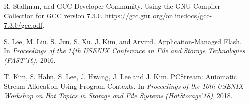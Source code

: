 \begin{thebibliography}{00}
R. Stallman, and GCC Developer Community.
Using the GNU Compiler Collection for GCC version 7.3.0.
\url{https://gcc.gnu.org/onlinedocs/gcc-7.3.0/gcc.pdf}.


S. Lee, M. Liu, S. Jun, S. Xu, J. Kim, and Arvind.
Application-Managed Flash.
In \textit{Proceedings of the 14th USENIX Conference on File and Storage
Technologies (FAST'16)}, 2016.

T. Kim, S. Hahn, S. Lee, J. Hwang, J. Lee and J. Kim.
PCStream: Automatic Stream Allocation Using Program Contexts.
In \textit{Proceedings of the 10th USENIX Workshop on Hot Topics in Storage
and File Systems (HotStorage'18)}, 2018.



\end{thebibliography}
